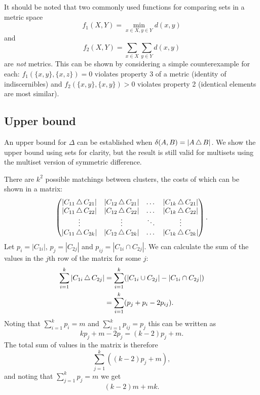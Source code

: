 

It should be noted that two commonly used functions for comparing sets in a
metric space
\begin{equation*}
  f_1(X, Y) = \min_{x \in X, y \in Y} d(x, y)
\end{equation*}
and
\begin{equation*}
  f_2(X, Y) = \sum_{x \in X} \sum_{y \in Y} d(x, y)
\end{equation*}
are \textit{not} metrics.  This can be shown by considering a simple
counterexample for each: $f_1(\{x,y\},\{x,z\}) = 0$ violates property 3 of a
metric (identity of indiscernibles) and $f_2(\{x,y\},\{x,y\}) > 0$ violates
property 2 (identical elements are most similar).

\subsection{Upper bound}
\label{sec:upper-bound}

An upper bound for $\Delta$ can be established when $\delta(A,B) = |A \operatorname{\bigtriangleup}
B|$.  We show the upper bound using sets for clarity, but the result is still
valid for multisets using the multiset version of symmetric difference.

There are $k^2$ possible matchings between clusters, the costs of which can be
shown in a matrix:
\begin{equation*}
  \begin{pmatrix}
    |C_{11} \operatorname{\bigtriangleup} C_{21}| & |C_{12} \operatorname{\bigtriangleup} C_{21}|
    & \dots & |C_{1k} \operatorname{\bigtriangleup} C_{21}| \\
    |C_{11} \operatorname{\bigtriangleup} C_{22} | & |C_{12} \operatorname{\bigtriangleup} C_{22} |
    & \dots & |C_{1k} \operatorname{\bigtriangleup} C_{22} | \\
    \vdots & \vdots & \ddots & \vdots \\
    |C_{11} \operatorname{\bigtriangleup} C_{2k} | & |C_{12} \operatorname{\bigtriangleup} C_{2k} |
    & \dots & |C_{1k} \operatorname{\bigtriangleup} C_{2k} |
  \end{pmatrix}.
\end{equation*}
Let $p_i = |C_{1i}|$, $p_j = |C_{2j}|$ and $p_{ij} = |C_{1i} \cap C_{2j}|$.
We can calculate the sum of the values in the $j$th row of the matrix for some
$j$:
\begin{align*}
  \sum_{i=1}^{k} |C_{1i} \operatorname{\bigtriangleup} C_{2j}| &= \sum_{i=1}^{k} (|C_{1i} \cup
  C_{2j}| - | C_{1i} \cap C_{2j}|) \\
  &= \sum_{i=1}^{k} (p_j + p_i - 2p_{ij}).
\end{align*}
Noting that $\sum_{i=1}^{k} p_i = m$ and $\sum_{i=1}^{k} p_{ij} = p_j$ this
can be written as
\begin{equation*}
  kp_j + m - 2p_j = (k-2)p_j + m.
\end{equation*}
The total sum of values in the matrix is therefore
\begin{equation*}
  \sum_{j=1}^{k} ((k-2)p_j + m),
\end{equation*}
and noting that $\sum_{j=1}^{k} p_j = m$ we get
\begin{equation*}
  (k-2)m + mk.
\end{equation*}

